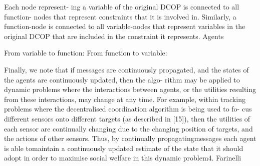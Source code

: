     
    Each node represent- ing a variable of the original DCOP is connected to all function- nodes that represent constraints that it is involved in. Similarly, a function-node is connected to all variable-nodes that represent variables in the original DCOP that are included in the constraint it represents. Agents


From variable to function:
From function to variable:



Finally, we note that if messages are continuously propagated,
and the states of the agents are continuously updated, then the algo- rithm may be applied to dynamic problems where the interactions between agents, or the utilities resulting from these interactions, may change at any time. For example, within tracking problems where the decentralised coordination algorithm is being used to fo- cus different sensors onto different targets (as described in [15]), then the utilities of each sensor are continually changing due to the changing position of targets, and the actions of other sensors. Thus, by continually propagatingmessages each agent is able tomaintain a continuously updated estimate of the state that it should adopt in order to maximise social welfare in this dynamic problem4. Farinelli
    
    